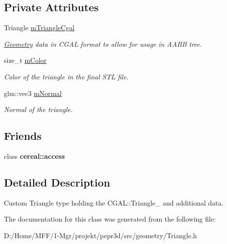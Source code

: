 \subsection*{Private Attributes}
\begin{DoxyCompactItemize}
\item 
\mbox{\label{classpepr3d_1_1_data_triangle_a772bbc9154b44aaeb7d62bd0842ed171}} 
Triangle \mbox{\hyperlink{classpepr3d_1_1_data_triangle_a772bbc9154b44aaeb7d62bd0842ed171}{m\+Triangle\+Cgal}}
\begin{DoxyCompactList}\small\item\em \mbox{\hyperlink{classpepr3d_1_1_geometry}{Geometry}} data in C\+G\+AL format to allow for usage in A\+A\+BB tree. \end{DoxyCompactList}\item 
\mbox{\label{classpepr3d_1_1_data_triangle_a2fe0967cc85bdb8f04639acbe3547f51}} 
size\+\_\+t \mbox{\hyperlink{classpepr3d_1_1_data_triangle_a2fe0967cc85bdb8f04639acbe3547f51}{m\+Color}}
\begin{DoxyCompactList}\small\item\em Color of the triangle in the final S\+TL file. \end{DoxyCompactList}\item 
\mbox{\label{classpepr3d_1_1_data_triangle_a86e289f4e1978d6e71240bf73ef8904e}} 
glm\+::vec3 \mbox{\hyperlink{classpepr3d_1_1_data_triangle_a86e289f4e1978d6e71240bf73ef8904e}{m\+Normal}}
\begin{DoxyCompactList}\small\item\em Normal of the triangle. \end{DoxyCompactList}\end{DoxyCompactItemize}
\subsection*{Friends}
\begin{DoxyCompactItemize}
\item 
\mbox{\label{classpepr3d_1_1_data_triangle_ab2f44cbb59a08132f4c843e5225bba0e}} 
class {\bfseries cereal\+::access}
\end{DoxyCompactItemize}


\subsection{Detailed Description}
Custom Triangle type holding the C\+G\+A\+L\+::\+Triangle\+\_ and additional data. 

The documentation for this class was generated from the following file\+:\begin{DoxyCompactItemize}
\item 
D\+:/\+Home/\+M\+F\+F/1-\/\+Mgr/projekt/pepr3d/src/geometry/Triangle.\+h\end{DoxyCompactItemize}
